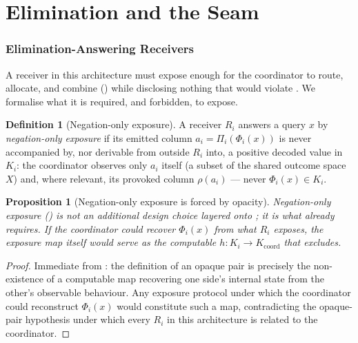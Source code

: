 \documentclass[11pt,twocolumn,a4paper]{article}
\theoremstyle{rdm}
\newtheorem{proposition}[theorem]{Proposition}
\theoremstyle{definition}
\newtheorem{definition}[theorem]{Definition}
\theoremstyle{remark}
\newcommand{\Cands}{X}
\newcommand{\Know}{K}
\newcommand{\Rec}{R}
\begin{document}
\part{Elimination and the Seam}
\label{part:seam}

\section{Elimination-Answering Receivers}
\label{sec:elimination}

A receiver in this architecture must expose enough for the coordinator to
route, allocate, and combine ()
while disclosing nothing that would violate . We
formalise what it is required, and forbidden, to expose.

\begin{definition}[Negation-only exposure]
\label{def:negation-exposure}
A receiver $\Rec_i$ answers a query $x$ by \emph{negation-only exposure} if
its emitted column $a_i=\Pi_i(\Phi_i(x))$ is never accompanied by, nor
derivable from outside $\Rec_i$ into, a positive decoded value in
$\Know_i$: the coordinator observes only $a_i$ itself (a subset of the
shared outcome space $\Cands$) and, where relevant, its provoked column
$\rho(a_i)$ — never $\Phi_i(x)\in\Know_i$.
\end{definition}

\begin{proposition}[Negation-only exposure is forced by opacity]
\label{prop:negation-forced}
Negation-only exposure () is not an additional
design choice layered onto ; it is what
 already requires. If the coordinator could recover
$\Phi_i(x)$ from what $\Rec_i$ exposes, the exposure map itself would serve
as the computable $h:\Know_i\to\Know_{\mathrm{coord}}$ that
 excludes.
\end{proposition}

\begin{proof}
Immediate from : the definition of an opaque pair is
precisely the non-existence of a computable map recovering one side's
internal state from the other's observable behaviour. Any exposure protocol
under which the coordinator could reconstruct $\Phi_i(x)$ would constitute
such a map, contradicting the opaque-pair hypothesis under which every
$\Rec_i$ in this architecture is related to the coordinator.
\end{proof}
\end{document}
